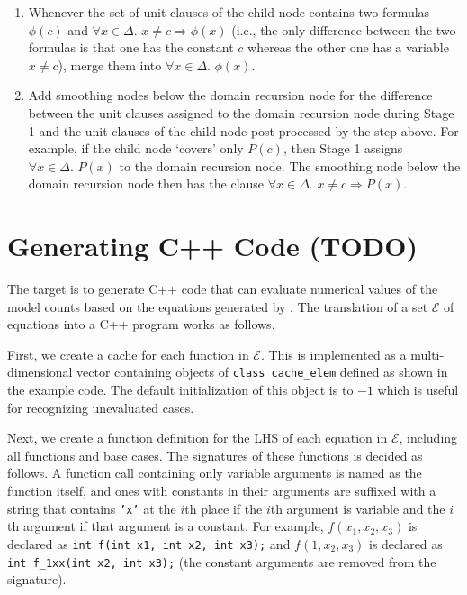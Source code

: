 \documentclass{article}
\theoremstyle{definition}
\begin{document}
\begin{enumerate}
  \item Whenever the set of unit clauses of the child node contains two formulas
        $\phi(c)$ and $\forall x \in \Delta\text{.
        } x \ne c \Rightarrow \phi(x)$ (i.e., the only difference between the
        two formulas is that one has the constant $c$ whereas the other one has
        a variable $x \ne c$), merge them into $\forall x \in \Delta\text{.
        }\phi(x)$.
  \item Add smoothing nodes below the domain recursion node for the difference
        between the unit clauses assigned to the domain recursion node during
        Stage 1 and the unit clauses of the child node post-processed by the
        step above. For example, if the child node `covers' only $P(c)$, then
        Stage 1 assigns $\forall x \in \Delta\text{. }P(x)$ to the domain
        recursion node. The smoothing node below the domain recursion node then
        has the clause $\forall x \in \Delta\text{. } x \ne c \Rightarrow P(x)$.
\end{enumerate}


\section{Generating C++ Code (TODO)}\label{sec:cpp}


The target is to generate C++ code that can evaluate numerical values of the
model counts based on the equations generated by \CompileWithBaseCases. The
translation of a set $\mathcal{E}$ of equations into a C++ program works as
follows.

First, we create a cache for each function in $\mathcal{E}$. This is implemented
as a multi-dimensional vector containing objects of \texttt{class cache\_elem}
defined as shown in the example code. The default initialization of this object
is to $-1$ which is useful for recognizing unevaluated cases.

Next, we create a function definition for the LHS of each equation in
$\mathcal{E}$, including all functions and base cases. The signatures of these
functions is decided as follows. A function call containing only variable
arguments is named as the function itself, and ones with constants in their
arguments are suffixed with a string that contains \texttt{'x'} at the $i$th
place if the $i$th argument is variable and the $i$th argument if that argument
is a constant. For example, $f(x_{1}, x_{2}, x_{3})$ is declared as \texttt{int
  f(int x1, int x2, int x3);} and $f(1, x_{2}, x_{3})$ is declared as
\texttt{int f\_1xx(int x2, int x3);} (the constant arguments are removed from
the signature).
\end{document}
